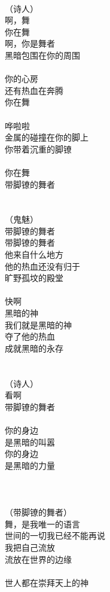 \\
（诗人）\\
啊，舞\\
你在舞\\
啊，你是舞者\\
黑暗包围在你的周围\\
\\
你的心房\\
还有热血在奔腾\\
你在舞\\
\\
哗啦啦\\
金属的碰撞在你的脚上\\
你带着沉重的脚镣\\
\\
你在舞\\
带脚镣的舞者\\
\\
\\
（鬼魅）\\
带脚镣的舞者\\
带脚镣的舞者\\
他来自什么地方\\
他的热血还没有归于\\
旷野孤坟的殿堂\\
\\
快啊\\
黑暗的神\\
我们就是黑暗的神\\
夺了他的热血\\
成就黑暗的永存\\
\\
\\
（诗人）\\
看啊\\
带脚镣的舞者\\
\\
你的身边\\
是黑暗的叫嚣\\
你的身边\\
是黑暗的力量\\
\\
\\
\\
（带脚镣的舞者）\\
舞，是我唯一的语言\\
世间的一切我已经不能再说\\
我把自己流放\\
流放在世界的边缘\\
\\
世人都在崇拜天上的神\\
